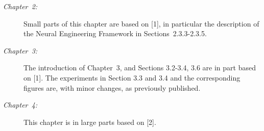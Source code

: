 \begin{description}
	\item[\normalfont\emph{Chapter~2:}] Small parts of this chapter are based on [1], in particular the description of the Neural Engineering Framework in Sections~2.3.3-2.3.5.
	\item[\normalfont\emph{Chapter~3:}] The introduction of Chapter~3, and Sections 3.2-3.4, 3.6 are in part based on [1].
	The experiments in Section 3.3 and 3.4 and the corresponding figures are, with minor changes, as previously published.
	\item[\normalfont\emph{Chapter~4:}] This chapter is in large parts based on [2].
\end{description}

\clearpage

